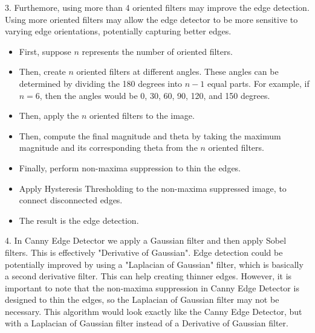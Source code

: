 \documentclass[12pt]{article}
\begin{document}
3. Furthemore, using more than 4 oriented filters may improve the edge detection. Using more oriented filters may allow the edge detector to be more sensitive to varying edge orientations, potentially capturing better edges.
\begin{itemize}
    \item First, suppose $n$ represents the number of oriented filters.
    \item Then, create $n$ oriented filters at different angles. These angles can be determined by dividing the 180 degrees into $n-1$ equal parts. For example, if $n=6$, then the angles would be 0, 30, 60, 90, 120, and 150 degrees.
    \item Then, apply the $n$ oriented filters to the image.
    \item Then, compute the final magnitude and theta by taking the maximum magnitude and its corresponding theta from the $n$ oriented filters.
    \item Finally, perform non-maxima suppression to thin the edges.
    \item Apply Hysteresis Thresholding to the non-maxima suppressed image, to connect disconnected edges.
    \item The result is the edge detection.
\end{itemize}
    
4. In Canny Edge Detector we apply a Gaussian filter and then apply Sobel filters. This is effectively "Derivative of Gaussian". Edge detection could be potentially improved by using a "Laplacian of Gaussian" filter, which is basically a second derivative filter. This can help creating thinner edges. However, it is important to note that the non-maxima suppression in Canny Edge Detector is designed to thin the edges, so the Laplacian of Gaussian filter may not be necessary. This algorithm would look exactly like the Canny Edge Detector, but with a Laplacian of Gaussian filter instead of a Derivative of Gaussian filter.
\end{document}
